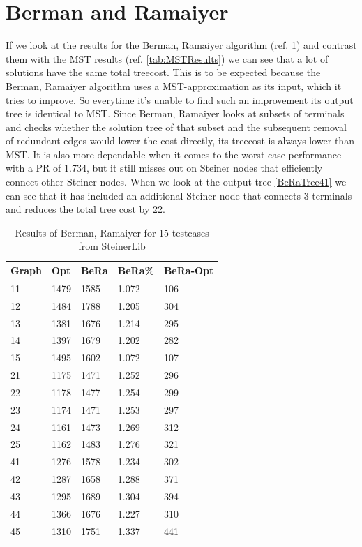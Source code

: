 \section{Berman and Ramaiyer}

If we look at the results for the Berman, Ramaiyer algorithm (ref. \ref{tab:BeRaResults}) and contrast them with the MST results (ref. \ref{tab:MSTResults}) we can see that a lot of solutions have the same total treecost. This is to be expected because the Berman, Ramaiyer algorithm uses a MST-approximation as its input, which it tries to improve. So everytime it's unable to find such an improvement its output tree is identical to MST. Since Berman, Ramaiyer looks at subsets of terminals and checks whether the solution tree of that subset and the subsequent removal of redundant edges would lower the cost directly, its treecost is always lower than MST. It is also more dependable when it comes to the worst case performance with a PR of 1.734, but it still misses out on Steiner nodes that efficiently connect other Steiner nodes. When we look at the output tree \ref{BeRaTree41} we can see that it has included an additional Steiner node that connects 3 terminals and reduces the total tree cost by 22.
\begin{table}[htbp]
 \caption{Results of Berman, Ramaiyer for 15 testcases from SteinerLib \cite{Dui93}}\label{tab:BeRaResults} 	
 \centering
 \begin{tabular}{l l l l l}
\toprule
Graph & Opt & BeRa & BeRa\% & BeRa-Opt \\
\midrule
11	& 1479	& 1585	& 1.072	& 106 \\
12	& 1484	& 1788	& 1.205	& 304 \\
13	& 1381	& 1676	& 1.214	& 295 \\
14	& 1397	& 1679	& 1.202	& 282 \\
15	& 1495	& 1602	& 1.072	& 107 \\
\midrule 
21	& 1175	& 1471	& 1.252	& 296 \\
22	& 1178	& 1477	& 1.254	& 299 \\
23	& 1174	& 1471	& 1.253	& 297 \\
24	& 1161	& 1473	& 1.269 	& 312 \\
25	& 1162	& 1483	& 1.276	& 321 \\
\midrule
41	& 1276	& 1578	& 1.234	& 302 \\
42	& 1287	& 1658	& 1.288	& 371 \\
43	& 1295	& 1689	& 1.304	& 394 \\
44	& 1366	& 1676	& 1.227	& 310 \\
45	& 1310	& 1751	& 1.337	& 441 \\
\bottomrule
\end{tabular}
\end{table}

